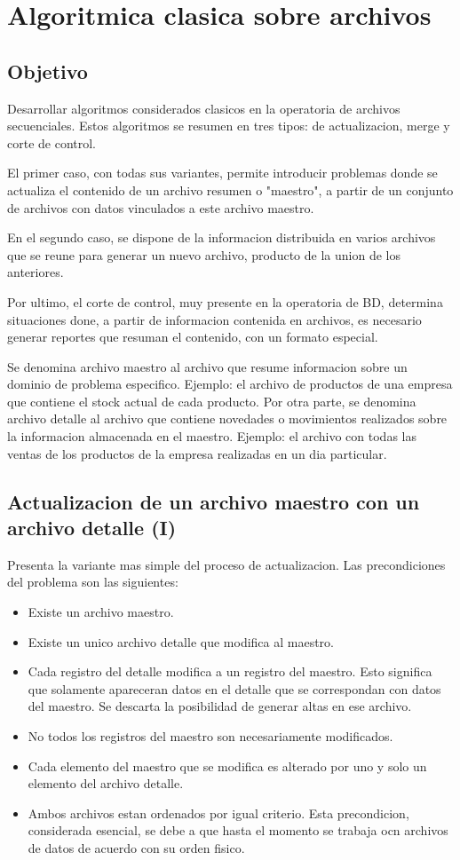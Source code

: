\section{Algoritmica clasica sobre archivos}

\subsection{Objetivo}
Desarrollar algoritmos considerados clasicos en la operatoria de archivos secuenciales. Estos algoritmos se resumen en tres tipos: de actualizacion, merge y corte de control.

El primer caso, con todas sus variantes, permite introducir problemas donde se actualiza el contenido de un archivo resumen o "maestro", a partir de un conjunto de archivos con datos vinculados a este archivo maestro.

En el segundo caso, se dispone de la informacion distribuida en varios archivos que se reune para generar un nuevo archivo, producto de la union de los anteriores.

Por ultimo, el corte de control, muy presente en la operatoria de BD, determina situaciones done, a partir de informacion contenida en archivos, es necesario generar reportes que resuman el contenido, con un formato especial.

Se denomina archivo maestro al archivo que resume informacion sobre un dominio de problema especifico. Ejemplo: el archivo de productos de una empresa que contiene el stock actual de cada producto. Por otra parte, se denomina archivo detalle al archivo que contiene novedades o movimientos realizados sobre la informacion almacenada en el maestro. Ejemplo: el archivo con todas las ventas de los productos de la empresa realizadas en un dia particular.

\subsection{Actualizacion de un archivo maestro con un archivo detalle (I)}
Presenta la variante mas simple del proceso de actualizacion. Las precondiciones del problema son las siguientes:
\begin{itemize}
    \item Existe un archivo maestro.
    \item Existe un unico archivo detalle que modifica al maestro.
    \item Cada registro del detalle modifica a un registro del maestro. Esto significa que solamente apareceran datos en el detalle que se correspondan con datos del maestro. Se descarta la posibilidad de generar altas en ese archivo.
    \item No todos los registros del maestro son necesariamente modificados.
    \item Cada elemento del maestro que se modifica es alterado por uno y solo un elemento del archivo detalle.
    \item Ambos archivos estan ordenados por igual criterio. Esta precondicion, considerada esencial, se debe a que hasta el momento se trabaja ocn archivos de datos de acuerdo con su orden fisico.
\end{itemize}

